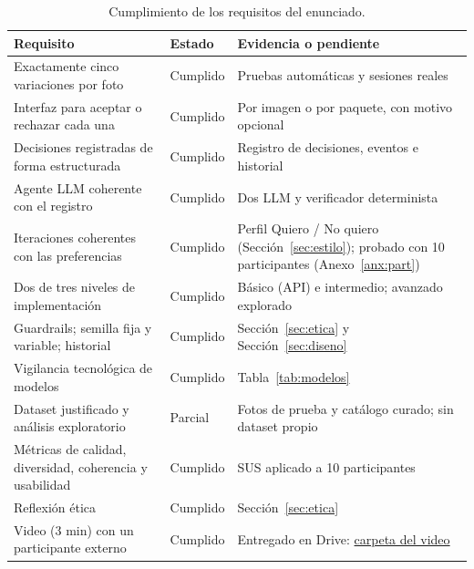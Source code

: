 \documentclass[11pt,letterpaper]{article}
\begin{document}
\begin{table}[H]
\centering
\caption{Cumplimiento de los requisitos del enunciado.}
\label{tab:req}
\small
\begin{tabularx}{\textwidth}{@{}p{5.2cm}p{2.0cm}L@{}}
\toprule
\textbf{Requisito} & \textbf{Estado} & \textbf{Evidencia o pendiente} \\
\midrule
Exactamente cinco variaciones por foto & Cumplido & Pruebas automáticas y sesiones reales \\
Interfaz para aceptar o rechazar cada una & Cumplido & Por imagen o por paquete, con motivo opcional \\
Decisiones registradas de forma estructurada & Cumplido & Registro de decisiones, eventos e historial \\
Agente LLM coherente con el registro & Cumplido & Dos LLM y verificador determinista \\
Iteraciones coherentes con las preferencias & Cumplido & Perfil Quiero / No quiero (Sección~\ref{sec:estilo}); probado con 10 participantes (Anexo~\ref{anx:part}) \\
Dos de tres niveles de implementación & Cumplido & Básico (API) e intermedio; avanzado explorado \\
Guardrails; semilla fija y variable; historial & Cumplido & Sección~\ref{sec:etica} y Sección~\ref{sec:diseno} \\
Vigilancia tecnológica de modelos & Cumplido & Tabla~\ref{tab:modelos} \\
Dataset justificado y análisis exploratorio & Parcial & Fotos de prueba y catálogo curado; sin dataset propio \\
Métricas de calidad, diversidad, coherencia y usabilidad & Cumplido & SUS aplicado a 10 participantes \\
Reflexión ética & Cumplido & Sección~\ref{sec:etica} \\
Video (3 min) con un participante externo & Cumplido & Entregado en Drive: \href{https://drive.google.com/drive/folders/1oVlVON_shFjK_XvaswokvbkEBkNmls46}{carpeta del video} \\
\bottomrule
\end{tabularx}
\end{table}

\clearpage
\end{document}
